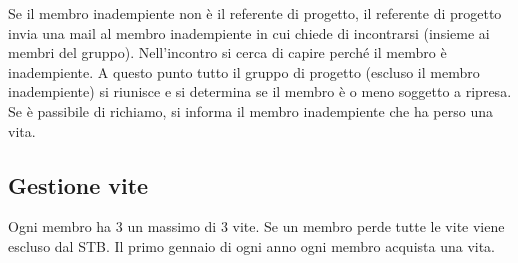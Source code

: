Se il membro inadempiente non è il referente di progetto, il referente di progetto invia una mail al membro inadempiente in cui chiede di incontrarsi (insieme ai membri del gruppo). Nell'incontro si cerca di capire perché il membro è inadempiente. A questo punto tutto il gruppo di progetto (escluso il membro inadempiente) si riunisce e si determina se il membro è o meno soggetto a ripresa. Se è passibile di richiamo, si informa il membro inadempiente che ha perso una vita.


\subsection{Gestione vite}

Ogni membro ha 3 un massimo di 3 vite. Se un membro perde tutte le vite viene escluso dal STB. Il primo gennaio di ogni anno ogni membro acquista una vita.